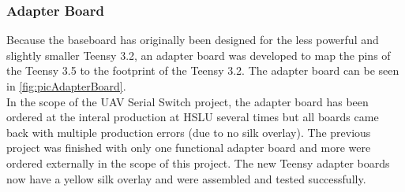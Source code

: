 \subsubsection{Adapter Board}
%
Because the baseboard has originally been designed for the less powerful and slightly smaller Teensy 3.2, an adapter board was developed to map the pins of the Teensy 3.5 to the footprint of the Teensy 3.2. The adapter board can be seen in \autoref{fig:picAdapterBoard}.\\
In the scope of the UAV Serial Switch project, the adapter board has been ordered at the interal production at HSLU several times but all boards came back with  multiple production errors (due to no silk overlay). The previous project was finished with only one functional adapter board and more were ordered externally in the scope of this project. The new Teensy adapter boards now have a yellow silk overlay and were assembled and tested successfully.
%
%
%

